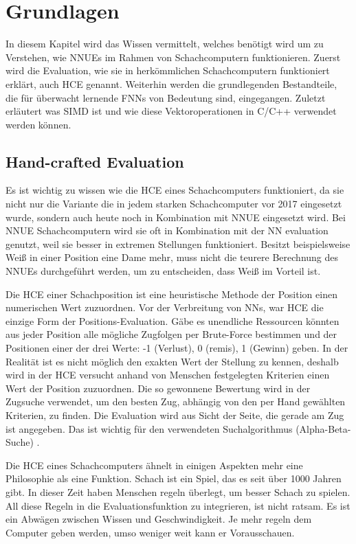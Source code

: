 \chapter{Grundlagen}

In diesem Kapitel wird das Wissen vermittelt, welches benötigt wird um zu Verstehen, wie \acp{NNUE} im Rahmen von Schachcomputern funktionieren. Zuerst wird die Evaluation, wie sie in herkömmlichen Schachcomputern funktioniert erklärt, auch \ac{HCE} genannt. Weiterhin werden die grundlegenden Bestandteile, die für überwacht lernende \acp{FNN} von Bedeutung sind, eingegangen. Zuletzt erläutert was \ac{SIMD} ist und wie diese Vektoroperationen in C/C++ verwendet werden können.

\section{Hand-crafted Evaluation}
\label{chap:HCE}

Es ist wichtig zu wissen wie die \ac{HCE} eines Schachcomputers funktioniert, da sie nicht nur die Variante die in jedem starken Schachcomputer vor 2017 eingesetzt wurde, sondern auch heute noch in Kombination mit \ac{NNUE} eingesetzt wird. Bei \ac{NNUE} Schachcomputern wird sie oft in Kombination mit der \ac{NN} evaluation genutzt, weil sie besser in extremen Stellungen funktioniert. Besitzt beispielsweise Weiß in einer Position eine Dame mehr, muss nicht die teurere Berechnung des \acp{NNUE} durchgeführt werden, um zu entscheiden, dass Weiß im Vorteil ist.

Die \ac{HCE} einer Schachposition ist eine heuristische Methode der Position einen numerischen Wert zuzuordnen. Vor der Verbreitung von \acp{NN}, war \ac{HCE} die einzige Form der Positions-Evaluation. Gäbe es unendliche Ressourcen könnten aus jeder Position alle mögliche Zugfolgen per Brute-Force bestimmen und der Positionen einer der drei Werte: -1 (Verlust), 0 (remis), 1 (Gewinn) geben. In der Realität ist es nicht möglich den exakten Wert der Stellung zu kennen, deshalb wird in der \ac{HCE} versucht anhand von Menschen festgelegten Kriterien einen Wert der Position zuzuordnen. Die so gewonnene Bewertung wird in der Zugsuche verwendet, um den besten Zug, abhängig von den per Hand gewählten Kriterien, zu finden. Die Evaluation wird aus Sicht der Seite, die gerade am Zug ist angegeben. Das ist wichtig für den verwendeten Suchalgorithmus (Alpha-Beta-Suche) \cite{Slagle1969}.

Die \ac{HCE} eines Schachcomputers ähnelt in einigen Aspekten mehr eine Philosophie als eine Funktion. Schach ist ein Spiel, das es seit über 1000 Jahren gibt. In dieser Zeit haben Menschen regeln überlegt, um besser Schach zu spielen. All diese Regeln in die Evaluationsfunktion zu integrieren, ist nicht ratsam. Es ist ein Abwägen zwischen Wissen und Geschwindigkeit. Je mehr regeln dem Computer geben werden, umso weniger weit kann er Vorausschauen.

